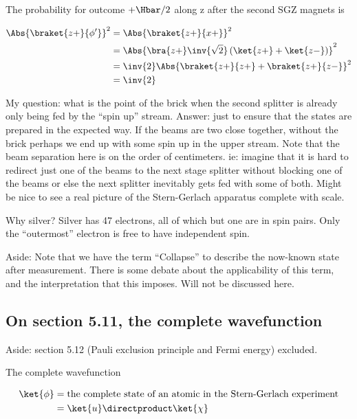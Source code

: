 The probability for outcome \(+\Hbar/2\) along z after the second SGZ magnets is

\begin{equation}\label{eqn:lecture7sternGerlach:240}
\begin{aligned}
\Abs{\braket{z+}{\phi'}}^2
&=
\Abs{\braket{z+}{x+}}^2 \\
&=
\Abs{\bra{z+} \inv{\sqrt{2}} \left( \ket{z+} + \ket{z-} \right) }^2 \\
&=
\inv{2}
\Abs{\braket{z+}{z+} + \braket{z+}{z-} }^2 \\
&=
\inv{2}
\end{aligned}
\end{equation}

My question: what is the point of the brick when the second splitter is already only being fed by the ``spin up'' stream.  Answer: just to ensure that the states are prepared in the expected way.  If the beams are two close together, without the brick perhaps we end up with some spin up in the upper stream.  Note that the beam separation here is on the order of centimeters.  ie: imagine that it is hard to redirect just one of the beams to the next stage splitter without blocking one of the beams or else the next splitter inevitably gets fed with some of both.  Might be nice to see a real picture of the Stern-Gerlach apparatus complete with scale.

Why silver?  Silver has 47 electrons, all of which but one are in spin pairs.  Only the ``outermost'' electron is free to have independent spin.

Aside: Note that we have the term ``Collapse'' to describe the now-known state after measurement.  There is some debate about the applicability of this term, and the interpretation that this imposes.  Will not be discussed here.

\subsection{On section 5.11, the complete wavefunction}

Aside: section 5.12 (Pauli exclusion principle and Fermi energy) excluded.

The complete wavefunction

\begin{equation}\label{eqn:lecture7sternGerlach:260}
\begin{aligned}
\ket{\phi} &= \text{the complete state of an atomic in the Stern-Gerlach experiment} \\
&=
\ket{u} \directproduct \ket{\chi}
\end{aligned}
\end{equation}

